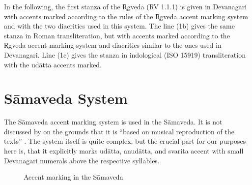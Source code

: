 In the following, the first stanza of the R̥gveda (RV 1.1.1) is given in Devanagari with accents marked according to the rules of the R̥gveda accent marking system and with the two diacritics used in this system. The line (1b) gives the same stanza in Roman transliteration, but with accents marked according to the R̥gveda accent marking system and diacritics similar to the ones used in Devanagari. Line (1c) gives the stanza in indological (ISO 15919) transliteration with the udātta accents marked.

\begin{exe}
\ex
\begin{xlist}
\end{xlist}
\end{exe}


\section{Sāmaveda System}

The Sāmaveda accent marking system is used in the Sāmaveda. It is not discussed by \citet{Witzel1974} on the grounds that it is “based on musical reproduction of the texts” \citep[p.~473]{Witzel1974}. The system itself is quite complex, but the crucial part for our purposes here is, that it explicitly marks udātta, anudātta, and svarita accent with small Devanagari numerals above the respective syllables.

\begin{figure}[!ht]
\begin{center}
\end{center}
\caption[Accent marking in the Sāmaveda]{\label{fig:SV-II-9-3-8-2}Accent marking in the Sāmaveda}
\end{figure}

